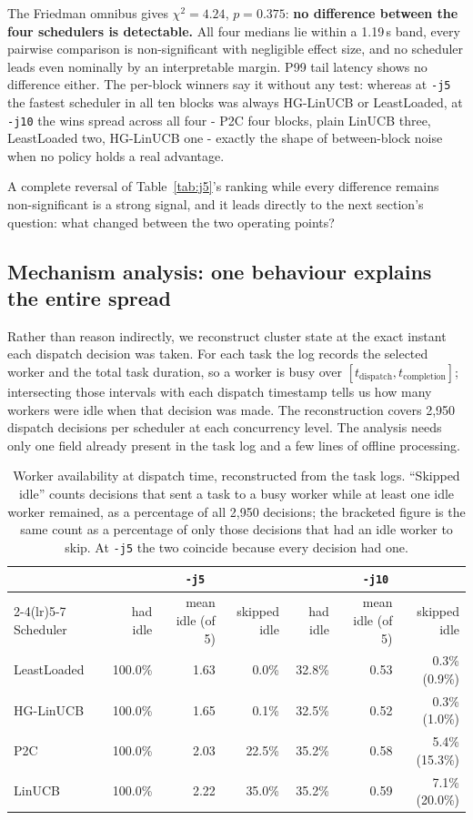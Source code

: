 \documentclass[final,5p,times,twocolumn]{elsarticle}
\begin{document}
The Friedman omnibus gives $\chi^2=4.24$, $p=0.375$: \textbf{no difference between the four schedulers is detectable.} All four medians lie within a 1.19\,s band, every pairwise comparison is non-significant with negligible effect size, and no scheduler leads even nominally by an interpretable margin. P99 tail latency shows no difference either. The per-block winners say it without any test: whereas at \texttt{-j5} the fastest scheduler in all ten blocks was always HG-LinUCB or LeastLoaded, at \texttt{-j10} the wins spread across all four - P2C four blocks, plain LinUCB three, LeastLoaded two, HG-LinUCB one - exactly the shape of between-block noise when no policy holds a real advantage.

A complete reversal of Table~\ref{tab:j5}'s ranking while every difference remains non-significant is a strong signal, and it leads directly to the next section's question: what changed between the two operating points?

\subsection{Mechanism analysis: one behaviour explains the entire spread}
\label{sec:mech}

Rather than reason indirectly, we reconstruct cluster state at the exact instant each dispatch decision was taken. For each task the log records the selected worker and the total task duration, so a worker is busy over $[t_{\text{dispatch}},t_{\text{completion}}]$; intersecting those intervals with each dispatch timestamp tells us how many workers were idle when that decision was made. The reconstruction covers 2,950 dispatch decisions per scheduler at each concurrency level. The analysis needs only one field already present in the task log and a few lines of offline processing.

\begin{table}[t]
\centering
\caption{Worker availability at dispatch time, reconstructed from the task logs. ``Skipped idle'' counts decisions that sent a task to a busy worker while at least one idle worker remained, as a percentage of all 2{,}950 decisions; the bracketed figure is the same count as a percentage of only those decisions that had an idle worker to skip. At \texttt{-j5} the two coincide because every decision had one.}
\label{tab:avail}
\small
\begin{tabular}{lrrrrrr}
\toprule
& \multicolumn{3}{c}{\texttt{-j5}} & \multicolumn{3}{c}{\texttt{-j10}} \\
\cmidrule(lr){2-4}\cmidrule(lr){5-7}
Scheduler & had idle & mean idle (of 5) & skipped idle & had idle & mean idle (of 5) & skipped idle \\
\midrule
LeastLoaded & 100.0\% & 1.63 & 0.0\% & 32.8\% & 0.53 & 0.3\% (0.9\%) \\
HG-LinUCB & 100.0\% & 1.65 & 0.1\% & 32.5\% & 0.52 & 0.3\% (1.0\%) \\
P2C & 100.0\% & 2.03 & 22.5\% & 35.2\% & 0.58 & 5.4\% (15.3\%) \\
LinUCB & 100.0\% & 2.22 & 35.0\% & 35.2\% & 0.59 & 7.1\% (20.0\%) \\
\bottomrule
\end{tabular}
\end{table}
\end{document}
